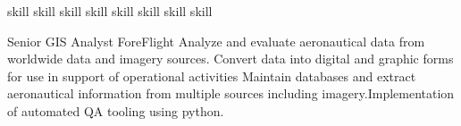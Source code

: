 \documentclass[letterpaper]{ReadableCV}
\begin{document}
	






\showHeader





		  {skill}
		  {skill}
		  {skill}
		  {skill}
		  {skill}
		  {skill}
		  {skill}
		  {skill}
		  


{}
        {Senior GIS Analyst}
        {ForeFlight}
        {Analyze and evaluate aeronautical data from worldwide data and imagery sources. Convert data into digital and graphic forms for use in support of operational activities Maintain databases and extract aeronautical information from multiple sources including imagery.Implementation of automated QA tooling using python.}
\end{document}
